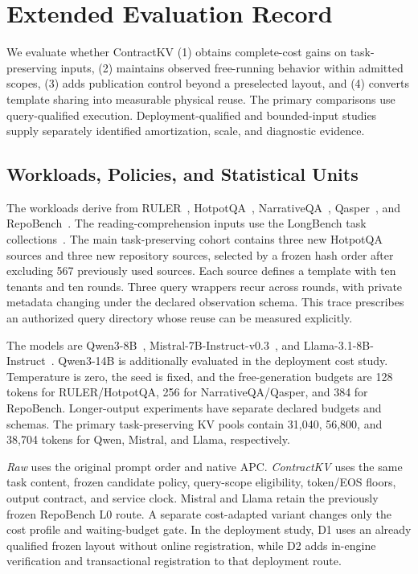 \section{Extended Evaluation Record}
\label{sec:evaluation}

We evaluate whether ContractKV (1) obtains complete-cost gains on task-preserving inputs, (2) maintains observed free-running behavior within admitted scopes, (3) adds publication control beyond a preselected layout, and (4) converts template sharing into measurable physical reuse. The primary comparisons use query-qualified execution. Deployment-qualified and bounded-input studies supply separately identified amortization, scale, and diagnostic evidence.

\subsection{Workloads, Policies, and Statistical Units}
\label{sec:protocol}
The workloads derive from RULER~\cite{ruler2024}, HotpotQA~\cite{hotpotqa2018}, NarrativeQA~\cite{narrativeqa2018}, Qasper~\cite{qasper2021}, and RepoBench~\cite{repobench2024}. The reading-comprehension inputs use the LongBench task collections~\cite{longbench2024}. The main task-preserving cohort contains three new HotpotQA sources and three new repository sources, selected by a frozen hash order after excluding 567 previously used sources. Each source defines a template with ten tenants and ten rounds. Three query wrappers recur across rounds, with private metadata changing under the declared observation schema. This trace prescribes an authorized query directory whose reuse can be measured explicitly.

The models are Qwen3-8B~\cite{qwen32025}, Mistral-7B-Instruct-v0.3~\cite{mistral2023}, and Llama-3.1-8B-Instruct~\cite{llama32024}. Qwen3-14B is additionally evaluated in the deployment cost study. Temperature is zero, the seed is fixed, and the free-generation budgets are 128 tokens for RULER/HotpotQA, 256 for NarrativeQA/Qasper, and 384 for RepoBench. Longer-output experiments have separate declared budgets and schemas. The primary task-preserving KV pools contain 31,040, 56,800, and 38,704 tokens for Qwen, Mistral, and Llama, respectively.

\emph{Raw} uses the original prompt order and native APC. \emph{ContractKV} uses the same task content, frozen candidate policy, query-scope eligibility, token/EOS floors, output contract, and service clock. Mistral and Llama retain the previously frozen RepoBench L0 route. A separate cost-adapted variant changes only the cost profile and waiting-budget gate. In the deployment study, D1 uses an already qualified frozen layout without online registration, while D2 adds in-engine verification and transactional registration to that deployment route.

